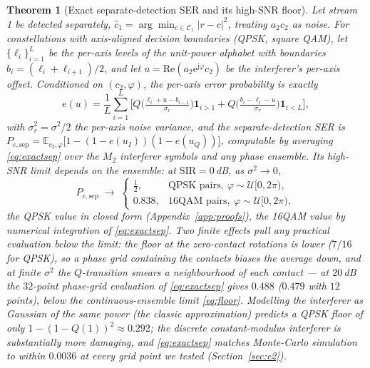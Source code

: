 \documentclass[journal]{IEEEtran}
\newcommand{\sir}{\mathrm{SIR}}
\newcommand{\ee}{\mathrm{e}}
\newcommand{\jj}{\mathrm{j}}
\newcommand{\const}{\mathcal{C}}
\newcommand{\VQ}{Q}
\newtheorem{theorem}{Theorem}
\begin{document}
\begin{theorem}[Exact separate-detection SER and its high-SNR floor]
\label{thm:floor}
Let stream 1 be detected separately, $\hat{c}_1 = \arg\min_{c \in
\const_1} |r - c|^2$, treating $a_2 c_2$ as noise. For constellations
with axis-aligned decision boundaries (QPSK, square QAM), let
$\{\ell_i\}_{i=1}^{L}$ be the per-axis levels of the unit-power
alphabet with boundaries $b_i = (\ell_i + \ell_{i+1})/2$, and let
$u = \mathrm{Re}(a_2 \ee^{\jj\varphi} c_2)$ be the interferer's
per-axis offset. Conditioned on $(c_2, \varphi)$, the per-axis error
probability is exactly
\begin{equation}
  e(u) = \frac{1}{L} \sum_{i=1}^{L}
  \Big[
  \VQ\!\Big(\tfrac{\ell_i + u - b_{i-1}}{\sigma_r}\Big)
  \mathbf{1}_{i > 1}
  +
  \VQ\!\Big(\tfrac{b_i - \ell_i - u}{\sigma_r}\Big)
  \mathbf{1}_{i < L}
  \Big],
  \label{eq:exactsep}
\end{equation}
with $\sigma_r^2 = \sigma^2 / 2$ the per-axis noise variance,
and the separate-detection SER is
$P_{e,\mathrm{sep}} = \mathbb{E}_{c_2, \varphi}\big[ 1 -
(1 - e(u_I))(1 - e(u_Q)) \big]$, computable by averaging
\eqref{eq:exactsep} over the $M_2$ interferer symbols and any phase
ensemble. Its high-SNR limit \emph{depends on the ensemble}: at
$\sir = 0$\,dB, as $\sigma^2 \to 0$,
\begin{equation}
  P_{e,\mathrm{sep}} \;\to\;
  \begin{cases}
    \frac{1}{2}, & \text{QPSK pairs},\ \varphi \sim
      \mathcal{U}[0, 2\pi),\\[2pt]
    0.838, & \text{16QAM pairs},\ \varphi \sim \mathcal{U}[0, 2\pi),
  \end{cases}
  \label{eq:floor}
\end{equation}
the QPSK value in closed form (Appendix~\ref{app:proofs}), the 16QAM
value by numerical integration of \eqref{eq:exactsep}. Two finite
effects pull any practical evaluation \emph{below} the limit: the floor
at the zero-contact rotations is lower ($7/16$ for QPSK), so a phase
grid containing the contacts biases the average down, and at finite
$\sigma^2$ the $Q$-transition smears a neighbourhood of each contact
--- at $20$\,dB the $32$-point phase-grid evaluation of
\eqref{eq:exactsep} gives $0.488$ ($0.479$ with $12$ points), below the
continuous-ensemble limit \eqref{eq:floor}. Modelling the interferer as Gaussian of the same
power (the classic approximation) predicts a QPSK floor of only
$1 - (1 - \VQ(1))^2 \approx 0.292$; the \emph{discrete}
constant-modulus interferer is substantially more damaging, and
\eqref{eq:exactsep} matches Monte-Carlo simulation to within $0.0036$
at every grid point we tested (Section~\ref{sec:e2}).
\end{theorem}
\end{document}
